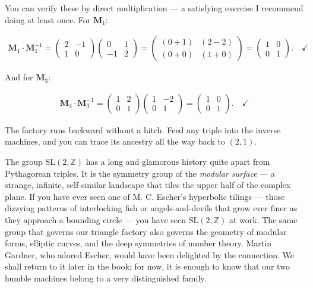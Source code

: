 \documentclass[11pt,twoside,openright]{book}
\theoremstyle{definition}
\theoremstyle{remark}
\begin{document}
You can verify these by direct multiplication --- a satisfying exercise I recommend doing at least once. For $\mathbf{M}_1$:

\begin{align*}
\mathbf{M}_1 \cdot \mathbf{M}_1^{-1} = \begin{pmatrix} 2 & -1 \\ 1 & 0 \end{pmatrix} \begin{pmatrix} 0 & 1 \\ -1 & 2 \end{pmatrix} = \begin{pmatrix} (0+1) & (2-2) \\ (0+0) & (1+0) \end{pmatrix} = \begin{pmatrix} 1 & 0 \\ 0 & 1 \end{pmatrix}. \quad \checkmark
\end{align*}

And for $\mathbf{M}_3$:

\begin{align*}
\mathbf{M}_3 \cdot \mathbf{M}_3^{-1} = \begin{pmatrix} 1 & 2 \\ 0 & 1 \end{pmatrix} \begin{pmatrix} 1 & -2 \\ 0 & 1 \end{pmatrix} = \begin{pmatrix} 1 & 0 \\ 0 & 1 \end{pmatrix}. \quad \checkmark
\end{align*}

The factory runs backward without a hitch. Feed any triple into the inverse machines, and you can trace its ancestry all the way back to $(2, 1)$.


The group $\mathrm{SL}(2, \mathbb{Z})$ has a long and glamorous history quite apart from Pythagorean triples. It is the symmetry group of the \textit{modular surface} --- a strange, infinite, self-similar landscape that tiles the upper half of the complex plane. If you have ever seen one of M. C. Escher's hyperbolic tilings --- those dizzying patterns of interlocking fish or angels-and-devils that grow ever finer as they approach a bounding circle --- you have seen $\mathrm{SL}(2, \mathbb{Z})$ at work. The same group that governs our triangle factory also governs the geometry of modular forms, elliptic curves, and the deep symmetries of number theory. Martin Gardner, who adored Escher, would have been delighted by the connection. We shall return to it later in the book; for now, it is enough to know that our two humble machines belong to a very distinguished family.
\end{document}
